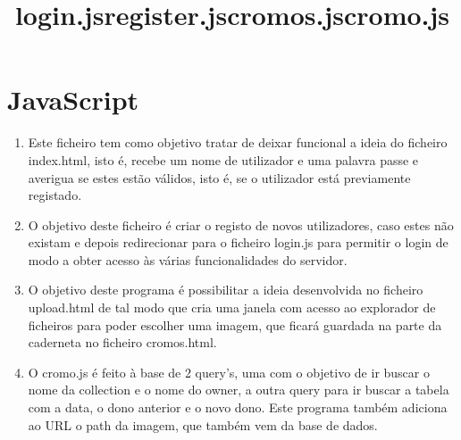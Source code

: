 \documentclass{report}
\begin{document}
\renewcommand{\theenumi}{\Roman{enumi}} 
\section{JavaScript}
\renewcommand{\theenumi}{\arabic{enumi}} 
\begin{enumerate} 

\item\title{\textbf{login.js}} 

Este ficheiro tem como objetivo tratar de deixar funcional a ideia do ficheiro index.html, isto é, recebe um nome de utilizador e uma palavra passe e averigua se estes estão válidos, isto é, se o utilizador está previamente registado.

\item\title{\textbf{register.js}}

O objetivo deste ficheiro é criar o registo de novos utilizadores, caso estes não existam e depois redirecionar para o ficheiro login.js para permitir o login de modo a obter acesso às várias funcionalidades do servidor.

\item\title{\textbf{cromos.js}}

O objetivo deste programa é possibilitar a ideia desenvolvida no ficheiro upload.html de tal modo que cria uma janela com acesso ao explorador de ficheiros para poder escolher uma imagem, que ficará guardada na parte da caderneta no ficheiro cromos.html.

\item\title{\textbf{cromo.js}}

O cromo.js é feito à base de 2 query's, uma com o objetivo de ir buscar o nome da collection e o nome do owner, a outra query para ir buscar a tabela com a data, o dono anterior e o novo dono. Este programa também adiciona ao URL o path da imagem, que também vem da base de dados.

\end{enumerate}
\pagebreak

\renewcommand{\theenumi}{\Roman{enumi}} 
\end{document}
